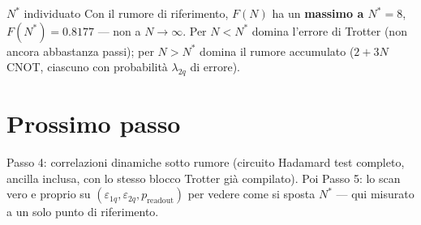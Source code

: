 \documentclass[11pt,a4paper]{article}
\begin{document}
\begin{okbox}{$N^*$ individuato}
Con il rumore di riferimento, $F(N)$ ha un \textbf{massimo a $N^*=8$},
$F(N^*)=0.8177$ --- non a $N\to\infty$. Per $N<N^*$ domina l'errore di
Trotter (non ancora abbastanza passi); per $N>N^*$ domina il rumore
accumulato ($2+3N$ CNOT, ciascuno con probabilità $\lambda_{2q}$ di errore).
\end{okbox}

\section*{Prossimo passo}

Passo 4: correlazioni dinamiche sotto rumore (circuito Hadamard test
completo, ancilla inclusa, con lo stesso blocco Trotter già compilato).
Poi Passo 5: lo scan vero e proprio su
$(\varepsilon_{1q},\varepsilon_{2q},p_\text{readout})$ per vedere come si
sposta $N^*$ --- qui misurato a un solo punto di riferimento.
\end{document}
